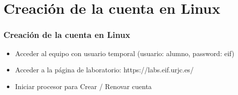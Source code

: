 \section{Creación de la cuenta en Linux}

\begin{frame}
\frametitle{Creación de la cuenta en Linux}

\begin{itemize}
	\item Acceder al equipo con usuario temporal (usuario: alumno, password: eif)
	\item Acceder a la página de laboratorio: https://labs.eif.urjc.es/
	\item Iniciar procesor para Crear / Renovar cuenta
\end{itemize}

\end{frame}
